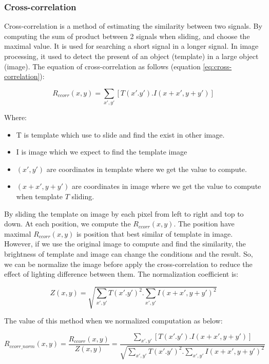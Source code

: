 \subsubsection{Cross-correlation}
Cross-correlation is a method of estimating the similarity between two signals. By computing the sum of product between 2 signals when sliding, and choose the maximal value. It is used for searching a short signal in a longer signal. In image processing, it used to detect the present of an object (template) in a large object (image). The equation of cross-correlation as follows (equation \ref{eq:cross-correlation}):
\begin{center}
\begin{equation}\label{eq:cross-correlation}
R_{ccorr}(x,y) = \sum\limits_{x',y'}[T(x'.y').I(x + x', y + y')]
\end{equation}
\end{center}
Where:
\begin{itemize}
\item T is template which use to slide and find the exist in other image.
\item I is image which we expect to find the template image
\item $(x', y')$ are coordinates in template where we get the value to compute.
\item $(x + x', y + y')$ are coordinates in image where we get the value to compute when template $T$ sliding.
\end{itemize}
By sliding the template on image by each pixel from left to right and top to down. At each position, we compute the $R_{ccorr}(x,y)$. The position have maximal $R_{ccorr}(x,y)$ is position that best similar of template in image.\\[0.2cm]
However, if we use the original image to compute and find the similarity, the brightness of template and image can change the conditions and the result. So, we can be normalize the image before apply the cross-correlation to reduce the effect of lighting difference between them. The normalization coefficient is:
\begin{center}
\begin{equation}\label{eq:normalizeCoff}
Z(x,y) = \sqrt{\sum\limits_{x',y'}T(x'.y')^{2}.\sum\limits_{x',y'}I(x + x', y + y')^{2}}
\end{equation}
\end{center}
The value of this method when we normalized computation as below:
\begin{center}
\begin{equation}\label{eq:cross-correlation}
R_{ccorr\_norm}(x,y) =\frac{R_{ccorr}(x,y)}{Z(x,y)} = \frac{\sum\limits_{x',y'}[T(x'.y').I(x + x', y + y')]}{\sqrt{\sum\limits_{x',y'}T(x'.y')^{2}.\sum\limits_{x',y'}I(x + x', y + y')^{2}}}
\end{equation}
\end{center}
